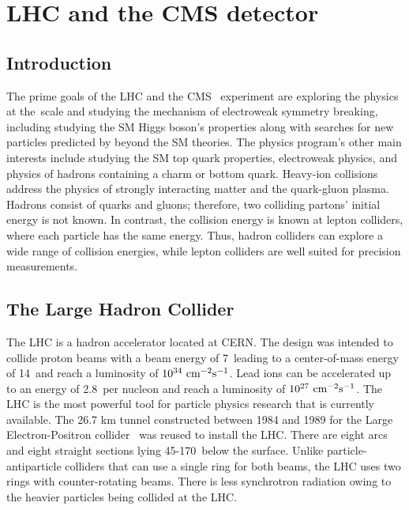 %
%

\chapter{LHC and the CMS detector}
\label{experiment}

\section{Introduction}

The prime goals of the LHC and the CMS~\cite{Chatrchyan:2008aa} experiment are exploring the physics at the~\TeV scale and studying the mechanism of electroweak symmetry breaking, including studying the SM Higgs boson's properties along with searches for new particles predicted by beyond the SM theories. The physics program's other main interests include studying the SM top quark properties, electroweak physics, and physics of hadrons containing a charm or bottom quark. Heavy-ion collisions address the physics of strongly interacting matter and the quark-gluon plasma. Hadrons consist of quarks and gluons; therefore, two colliding partons' initial energy is not known. In contrast, the collision energy is known at lepton colliders, where each particle has the same energy. Thus, hadron colliders can explore a wide range of collision energies, while lepton colliders are well suited for precision measurements.

\section{The Large Hadron Collider}
\label{sec:LHC}

The LHC is a hadron accelerator located at CERN. The design was intended to collide proton beams with a beam energy of 7~\TeV leading to a center-of-mass energy of 14~\TeV and reach a luminosity of $10^{34}~\text{cm}^{-2}\text{s}^{-1}$. Lead ions can be accelerated up to an energy of 2.8~\TeV per nucleon and reach a luminosity of $10^{27}~\text{cm}^{-2}\text{s}^{-1}$. The LHC is the most powerful tool for particle physics research that is currently available. The 26.7 km tunnel constructed between 1984 and 1989 for the Large Electron-Positron collider~\cite{Electron-Positron:1997351} was reused to install the LHC. There are eight arcs and eight straight sections lying 45-170~\m below the surface. Unlike particle-antiparticle colliders that can use a single ring for both beams, the LHC uses two rings with counter-rotating beams. There is less synchrotron radiation owing to the heavier particles being collided at the LHC.

